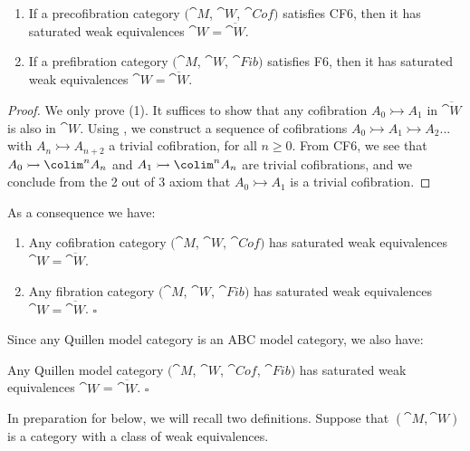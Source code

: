 \begin{lem}
\label{lem::cofcatissat}
\mbox{}
\begin{enumerate}
\item
If a precofibration category $({\cat M}$, ${\cat W}$, ${\cat Cof})$ satisfies CF6, then it has saturated weak equivalences ${\cat W} = \overline{\cat W}$.
\item
If a prefibration category $({\cat M}$, ${\cat W}$, ${\cat Fib})$ satisfies F6, then it has saturated weak equivalences ${\cat W} = \overline{\cat W}$.
\end{enumerate}
\end{lem}

\begin{proof}
We only prove (1). It suffices to show that any cofibration $A_0 \rightarrowtail A_1$ in $\overline{\cat W}$ is also in ${\cat W}$. Using , we construct a sequence of cofibrations $A_0 \rightarrowtail A_1 \rightarrowtail A_2 ...$ with $A_n \rightarrowtail A_{n+2}$ a trivial cofibration, for all $n \ge 0$. From CF6, we see that $A_0 \rightarrowtail \colim^n A_n$ and $A_1 \rightarrowtail \colim^n A_n$ are trivial cofibrations, and we conclude from the 2 out of 3 axiom that $A_0 \rightarrowtail A_1$ is a trivial cofibration.
\end{proof}

As a consequence we have:
\begin{thm}
\label{thm::cofcatissat}
\mbox{}
\begin{enumerate}
\item
Any cofibration category $({\cat M}$, ${\cat W}$, ${\cat Cof})$ has saturated weak equivalences ${\cat W} = \overline{\cat W}$.
\item
Any fibration category $({\cat M}$, ${\cat W}$, ${\cat Fib})$ has saturated weak equivalences ${\cat W} = \overline{\cat W}$. $\square$
\end{enumerate}
\end{thm}

Since any Quillen model category is an ABC model category, we also have:
\begin{thm}
\label{thm:quillensaturatedweq}
Any Quillen model category $({\cat M}$, ${\cat W}$, ${\cat Cof}$, ${\cat Fib})$ has saturated weak equivalences ${\cat W}$ = $\overline{\cat W}$. $\square$
\end{thm}

In preparation for  below, we will recall two definitions. Suppose that $({\cat M}, {\cat W})$ is a category with a class of weak equivalences.

